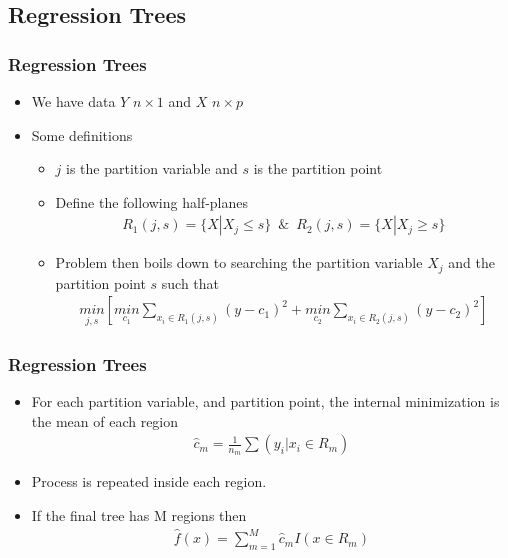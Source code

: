 \documentclass[
  shownotes,
  xcolor={svgnames},
  hyperref={colorlinks,citecolor=DarkBlue,linkcolor=DarkRed,urlcolor=DarkBlue}
  ]{beamer}
\begin{document}
\subsection{Regression Trees}
\begin{frame}[fragile]
\frametitle{Regression Trees}

\begin{itemize}
\item We have data $Y$ $n\times 1$ and $X$ $n\times p$
\item Some definitions
\begin{itemize}
\item $j$ is the partition variable and $s$ is the partition point
\item Define the following half-planes
\begin{align}
R_1(j,s)=\{X|X_j\leq s\} \,\,\, \& \,\,\, R_2(j,s)=\{X|X_j\geq s\}
\end{align}
\item Problem then boils down to searching the partition variable $X_j$ and the partition point $s$ such that
\begin{align}
\underset{j,s}{min} \left[ \underset{c_1}{min}\sum_{x_i\in R_1(j,s)}(y-c_1)^2+ \underset{c_2}{min}\sum_{x_i\in R_2(j,s)}(y-c_2)^2\right]
\end{align}
\end{itemize}
\end{itemize}
\end{frame}
\begin{frame}[fragile]
\frametitle{Regression Trees}

\begin{itemize}
\item For each partition variable, and partition point, the internal minimization is the mean of each region
\begin{align}
 \hat{c}_m =\frac{1}{n_m} \sum(y_i|x_i \in R_m)
\end{align}
\item Process is repeated inside each region. 
\item If the final tree has M regions then 
\begin{align}
\hat{f}(x) = \sum_{m=1}^M \hat{c}_m I(x \in R_m)
\end{align}

\end{itemize}

\end{frame}
\end{document}

